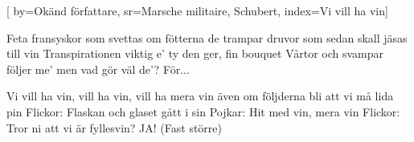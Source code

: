 

[ 		%
	by={Okänd författare},					%
	sr={Marsche militaire, Schubert},					%
	index={Vi vill ha vin}]						%
	

\beginverse*						%
Feta fransyskor som svettas om fötterna
de trampar druvor som sedan skall jäsas till vin
Transpirationen viktig e’
ty den ger, fin bouquet
Vårtor och svampar följer me’
men vad gör väl de’?
För...
\endverse							%

\beginchorus						%
Vi vill ha vin, vill ha vin, vill ha mera vin
även om följderna bli att vi må lida pin
Flickor: Flaskan och glaset gått i sin
Pojkar: Hit med vin, mera vin
Flickor: Tror ni att vi är fyllesvin?
JA! (Fast större)
\endchorus							%
\endsong							%